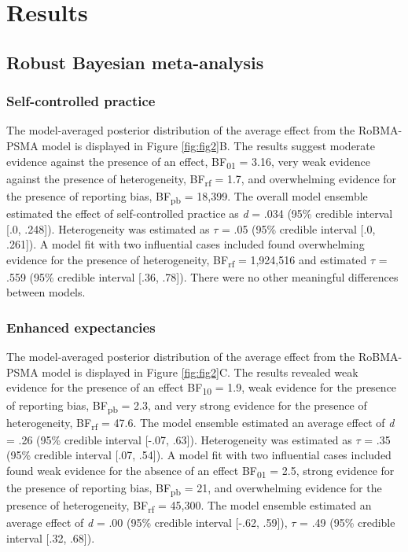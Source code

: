 \documentclass[
  man, donotrepeattitle,floatsintext]{apa7}
\begin{document}
\hypertarget{results}{%
\section{Results}\label{results}}

\hypertarget{robust-bayesian-meta-analysis-1}{%
\subsection{Robust Bayesian meta-analysis}\label{robust-bayesian-meta-analysis-1}}

\hypertarget{self-controlled-practice}{%
\subsubsection{Self-controlled practice}\label{self-controlled-practice}}

The model-averaged posterior distribution of the average effect from the RoBMA-PSMA model is displayed in Figure \ref{fig:fig2}B. The results suggest moderate evidence against the presence of an effect, BF\textsubscript{01} = 3.16, very weak evidence against the presence of heterogeneity, BF\textsubscript{rf} = 1.7, and overwhelming evidence for the presence of reporting bias, BF\textsubscript{pb} = 18,399. The overall model ensemble estimated the effect of self-controlled practice as \emph{d} = .034 (95\% credible interval {[}.0, .248{]}). Heterogeneity was estimated as \(\tau\) = .05 (95\% credible interval {[}.0, .261{]}). A model fit with two influential cases included found overwhelming evidence for the presence of heterogeneity, BF\textsubscript{rf} = 1,924,516 and estimated \(\tau\) = .559 (95\% credible interval {[}.36, .78{]}). There were no other meaningful differences between models.

\hypertarget{enhanced-expectancies}{%
\subsubsection{Enhanced expectancies}\label{enhanced-expectancies}}

The model-averaged posterior distribution of the average effect from the RoBMA-PSMA model is displayed in Figure \ref{fig:fig2}C. The results revealed weak evidence for the presence of an effect BF\textsubscript{10} = 1.9, weak evidence for the presence of reporting bias, BF\textsubscript{pb} = 2.3, and very strong evidence for the presence of heterogeneity, BF\textsubscript{rf} = 47.6. The model ensemble estimated an average effect of \emph{d} = .26 (95\% credible interval {[}-.07, .63{]}). Heterogeneity was estimated as \(\tau\) = .35 (95\% credible interval {[}.07, .54{]}). A model fit with two influential cases included found weak evidence for the absence of an effect BF\textsubscript{01} = 2.5, strong evidence for the presence of reporting bias, BF\textsubscript{pb} = 21, and overwhelming evidence for the presence of heterogeneity, BF\textsubscript{rf} = 45,300. The model ensemble estimated an average effect of \emph{d} = .00 (95\% credible interval {[}-.62, .59{]}), \(\tau\) = .49 (95\% credible interval {[}.32, .68{]}).
\end{document}
